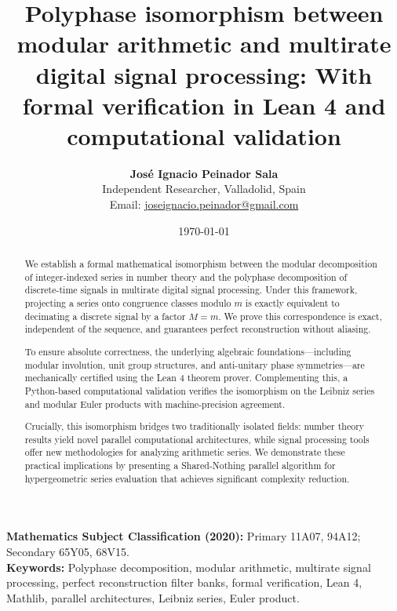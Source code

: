 \documentclass{article}
\theoremstyle{plain}
\theoremstyle{definition}
\theoremstyle{remark}
\begin{document}
\title{Polyphase isomorphism between modular arithmetic and multirate digital signal processing: With formal verification in Lean 4 and computational validation}

\author{
    \textbf{José Ignacio Peinador Sala} \\
    \small Independent Researcher, Valladolid, Spain \\
    \small Email: \href{mailto:joseignacio.peinador@gmail.com}{joseignacio.peinador@gmail.com}
}

\date{\today}

\maketitle

\begin{abstract}
We establish a formal mathematical isomorphism between the modular decomposition of integer-indexed series in number theory and the polyphase decomposition of discrete-time signals in multirate digital signal processing. Under this framework, projecting a series onto congruence classes modulo $m$ is exactly equivalent to decimating a discrete signal by a factor $M=m$. We prove this correspondence is exact, independent of the sequence, and guarantees perfect reconstruction without aliasing. 

To ensure absolute correctness, the underlying algebraic foundations—including modular involution, unit group structures, and anti-unitary phase symmetries—are mechanically certified using the Lean 4 theorem prover. Complementing this, a Python-based computational validation verifies the isomorphism on the Leibniz series and modular Euler products with machine-precision agreement. 

Crucially, this isomorphism bridges two traditionally isolated fields: number theory results yield novel parallel computational architectures, while signal processing tools offer new methodologies for analyzing arithmetic series. We demonstrate these practical implications by presenting a Shared-Nothing parallel algorithm for hypergeometric series evaluation that achieves significant complexity reduction.
\end{abstract}

\vspace{1em}
\noindent \textbf{Mathematics Subject Classification (2020):} Primary 11A07, 94A12; Secondary 65Y05, 68V15. \\
\noindent \textbf{Keywords:} Polyphase decomposition, modular arithmetic, multirate signal processing, perfect reconstruction filter banks, formal verification, Lean 4, Mathlib, parallel architectures, Leibniz series, Euler product.
\end{document}
